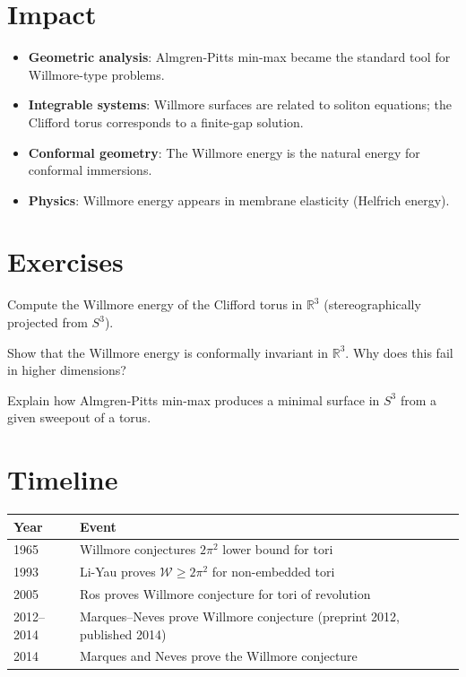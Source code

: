 \section{Impact}
\begin{itemize}
\item \textbf{Geometric analysis}: Almgren-Pitts min-max became the standard tool for Willmore-type problems.
\item \textbf{Integrable systems}: Willmore surfaces are related to soliton equations; the Clifford torus corresponds to a finite-gap solution.
\item \textbf{Conformal geometry}: The Willmore energy is the natural energy for conformal immersions.
\item \textbf{Physics}: Willmore energy appears in membrane elasticity (Helfrich energy).
\end{itemize}

\section{Exercises}

\begin{exercise}[Basic]
Compute the Willmore energy of the Clifford torus in $\mathbb{R}^3$ (stereographically projected from $S^3$).
\end{exercise}

\begin{exercise}[Intermediate]
Show that the Willmore energy is conformally invariant in $\mathbb{R}^3$. Why does this fail in higher dimensions?
\end{exercise}

\begin{exercise}[Advanced]
Explain how Almgren-Pitts min-max produces a minimal surface in $S^3$ from a given sweepout of a torus.
\end{exercise}

\section{Timeline}

\begin{tabularx}{\linewidth}{lX}
\toprule
\textbf{Year} & \textbf{Event} \\ \midrule
1965 & Willmore conjectures $2\pi^2$ lower bound for tori \\ 
1993 & Li-Yau proves $\mathcal{W} \ge 2\pi^2$ for non-embedded tori \\ 
2005 & Ros proves Willmore conjecture for tori of revolution \\ 
2012--2014 & Marques--Neves prove Willmore conjecture (preprint 2012, published 2014) \\
2014 & Marques and Neves prove the Willmore conjecture \\ \bottomrule
\end{tabularx}

